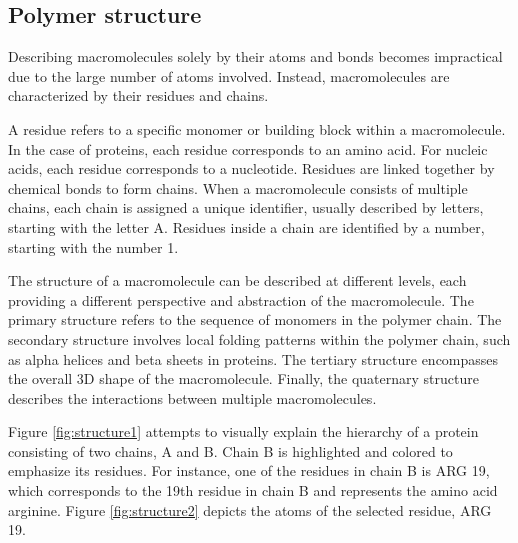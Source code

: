 \documentclass[
  digital,     %
  oneside,     %
  nosansbold,  %
  nocolorbold, %
  lof,         %
  lot,         %
]{fithesis4}
\begin{document}
\subsection{Polymer structure}
\label{section:polymer_structure}


Describing macromolecules solely by their atoms and bonds becomes impractical due to the large number of atoms involved. Instead, macromolecules are characterized by their residues and chains.

A residue refers to a specific monomer or building block within a macromolecule. In the case of proteins, each residue corresponds to an amino acid. For nucleic acids, each residue corresponds to a nucleotide. Residues are linked together by chemical bonds to form chains. When a macromolecule consists of multiple chains, each chain is assigned a unique identifier, usually described by letters, starting with the letter A. Residues inside a chain are identified by a number, starting with the number 1.

The structure of a macromolecule can be described at different levels, each providing a different perspective and abstraction of the macromolecule. The primary structure refers to the sequence of monomers in the polymer chain. The secondary structure involves local folding patterns within the polymer chain, such as alpha helices and beta sheets in proteins. The tertiary structure encompasses the overall 3D shape of the macromolecule. Finally, the quaternary structure describes the interactions between multiple macromolecules.


Figure \ref{fig:structure1} attempts to visually explain the hierarchy of a protein consisting of two chains, A and B. Chain B is highlighted and colored to emphasize its residues. For instance, one of the residues in chain B is ARG 19, which corresponds to the 19th residue in chain B and represents the amino acid arginine. Figure \ref{fig:structure2} depicts the atoms of the selected residue, ARG 19.
\end{document}
